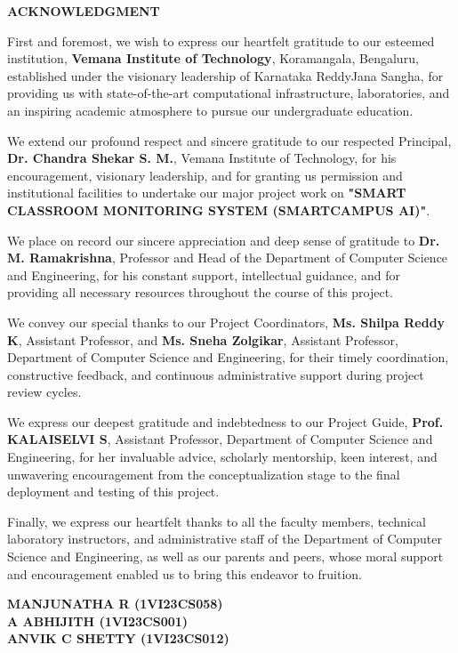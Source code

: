 \newpage
\begin{center}
{\fontsize{14pt}{18pt}\selectfont \textbf{ACKNOWLEDGMENT}}\\[3mm]
\end{center}

\onehalfspacing
\justifying
\noindent First and foremost, we wish to express our heartfelt gratitude to our esteemed institution, \textbf{Vemana Institute of Technology}, Koramangala, Bengaluru, established under the visionary leadership of Karnataka ReddyJana Sangha, for providing us with state-of-the-art computational infrastructure, laboratories, and an inspiring academic atmosphere to pursue our undergraduate education.

\noindent We extend our profound respect and sincere gratitude to our respected Principal, \textbf{Dr. Chandra Shekar S. M.}, Vemana Institute of Technology, for his encouragement, visionary leadership, and for granting us permission and institutional facilities to undertake our major project work on \textbf{"SMART CLASSROOM MONITORING SYSTEM (SMARTCAMPUS AI)"}.

\noindent We place on record our sincere appreciation and deep sense of gratitude to \textbf{Dr. M. Ramakrishna}, Professor and Head of the Department of Computer Science and Engineering, for his constant support, intellectual guidance, and for providing all necessary resources throughout the course of this project.

\noindent We convey our special thanks to our Project Coordinators, \textbf{Ms. Shilpa Reddy K}, Assistant Professor, and \textbf{Ms. Sneha Zolgikar}, Assistant Professor, Department of Computer Science and Engineering, for their timely coordination, constructive feedback, and continuous administrative support during project review cycles.

\noindent We express our deepest gratitude and indebtedness to our Project Guide, \textbf{Prof. KALAISELVI S}, Assistant Professor, Department of Computer Science and Engineering, for her invaluable advice, scholarly mentorship, keen interest, and unwavering encouragement from the conceptualization stage to the final deployment and testing of this project.

\noindent Finally, we express our heartfelt thanks to all the faculty members, technical laboratory instructors, and administrative staff of the Department of Computer Science and Engineering, as well as our parents and peers, whose moral support and encouragement enabled us to bring this endeavor to fruition.

\vspace{0.4in}
\begin{flushright}
\textbf{MANJUNATHA R (1VI23CS058)}\\[2mm]
\textbf{A ABHIJITH (1VI23CS001)}\\[2mm]
\textbf{ANVIK C SHETTY (1VI23CS012)}
\end{flushright}
\newpage
